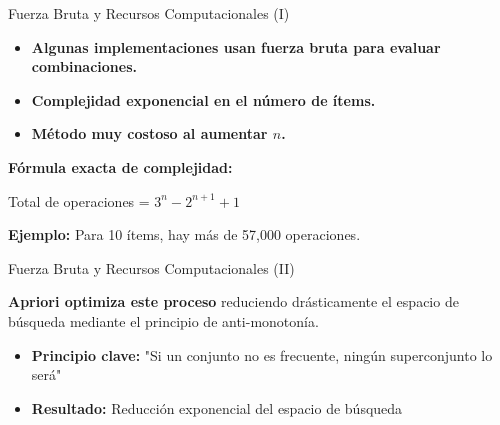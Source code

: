 \documentclass{beamer}
\begin{document}
\begin{frame}{Fuerza Bruta y Recursos Computacionales (I)}
    \begin{tcolorbox}[
        colback=apriori-blue,
        colframe=apriori-blue,
        coltext=black,
        arc=5mm,
        boxrule=0pt,
        width=0.9\textwidth,
        title={\textbf{Desafío Computacional}},
        coltitle=white,
        fonttitle=\bfseries
    ]
        \begin{itemize}
            \item \textbf{Algunas implementaciones usan fuerza bruta para evaluar combinaciones.}
            \item \textbf{Complejidad exponencial en el número de ítems.}
            \item \textbf{Método muy costoso al aumentar $n$.}
        \end{itemize}
    \end{tcolorbox}
    
    \vspace{0.7cm}
    
    \begin{center}
        \textbf{Fórmula exacta de complejidad:}
        
        \vspace{0.4cm}
        \large
        Total de operaciones = $3^n - 2^{n+1} + 1$
        
        \vspace{0.7cm}
        \textbf{Ejemplo:} Para 10 ítems, hay más de 57,000 operaciones.
    \end{center}
\end{frame}

\begin{frame}{Fuerza Bruta y Recursos Computacionales (II)}
    \begin{center}
        \begin{tcolorbox}[
            colback=orange!30,
            colframe=orange,
            coltext=black!95,
            arc=5mm,
            boxrule=1.5pt,
            width=0.8\textwidth
        ]
            \centering
            \textbf{Apriori optimiza este proceso} reduciendo drásticamente el espacio de búsqueda mediante el principio de anti-monotonía.
        \end{tcolorbox}
    \end{center}
    
    \vspace{0.7cm}
    
    \begin{itemize}
        \item \textbf{Principio clave:} "Si un conjunto no es frecuente, ningún superconjunto lo será"
        \item \textbf{Resultado:} Reducción exponencial del espacio de búsqueda
    \end{itemize}
\end{frame}
\end{document}
